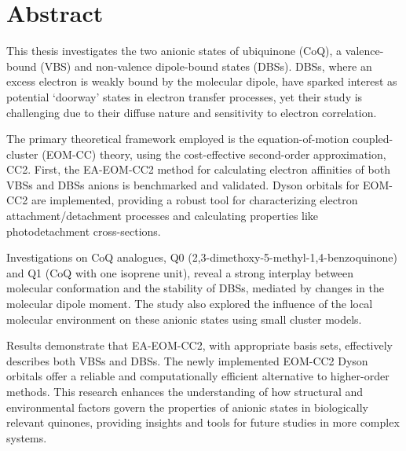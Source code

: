 \chapter{Abstract}                                 \label{ch:abstract}

This thesis investigates the two anionic states of ubiquinone (CoQ), a valence-bound (VBS) and non-valence dipole-bound states (DBSs). DBSs, where an excess electron is weakly bound by the molecular dipole, have sparked interest as potential `doorway' states in electron transfer processes, yet their study is challenging due to their diffuse nature and sensitivity to electron correlation.

The primary theoretical framework employed is the equation-of-motion coupled-cluster (EOM-CC) theory, using the cost-effective second-order approximation, CC2. First, the EA-EOM-CC2 method for calculating electron affinities of both VBSs and DBSs anions is benchmarked and validated. Dyson orbitals for EOM-CC2 are implemented, providing a robust tool for characterizing electron attachment/detachment processes and calculating properties like photodetachment cross-sections.

Investigations on CoQ analogues, Q0 (2,3-dimethoxy-5-methyl-1,4-benzoquinone) and Q1 (CoQ with one isoprene unit), reveal a strong interplay between molecular conformation and the stability of DBSs, mediated by changes in the molecular dipole moment. The study also explored the influence of the local molecular environment on these anionic states using small cluster models.

Results demonstrate that EA-EOM-CC2, with appropriate basis sets, effectively describes both VBSs and DBSs. The newly implemented EOM-CC2 Dyson orbitals offer a reliable and computationally efficient alternative to higher-order methods. This research enhances the understanding of how structural and environmental factors govern the properties of anionic states in biologically relevant quinones, providing insights and tools for future studies in more complex systems.

\cleardoublepage

